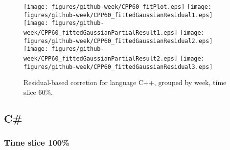 \begin{figure}[hb]
\centering
{}
{\texttt{[image: figures/github-week/CPP60\_fitPlot.eps]}}
{\texttt{[image: figures/github-week/CPP60\_fittedGaussianResidual1.eps]}}
{\texttt{[image: figures/github-week/CPP60\_fittedGaussianPartialResult1.eps]}}
{\texttt{[image: figures/github-week/CPP60\_fittedGaussianResidual2.eps]}}
{\texttt{[image: figures/github-week/CPP60\_fittedGaussianPartialResult2.eps]}}
{\texttt{[image: figures/github-week/CPP60\_fittedGaussianResidual3.eps]}}
\caption{Residual-based corretion for language C++, grouped by week, time slice 60\%.}
\end{figure}


\clearpage 
\newpage 


\subsection{C\#}

\FloatBarrier

\subsubsection{Time slice 100\%}

